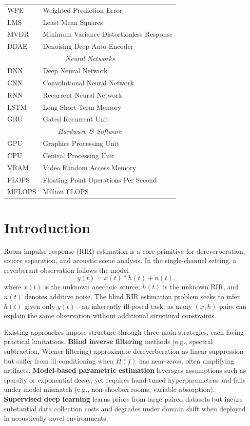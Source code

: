 \documentclass[12pt,a4paper]{article}
\begin{document}
\begin{table}[h]
\begin{tabular}{ll}
WPE & Weighted Prediction Error \\
LMS & Least Mean Squares \\
MVDR & Minimum Variance Distortionless Response \\
DDAE & Denoising Deep Auto-Encoder \\
\midrule
\multicolumn{2}{c}{\textit{Neural Networks}} \\
\midrule
DNN & Deep Neural Network \\
CNN & Convolutional Neural Network \\
RNN & Recurrent Neural Network \\
LSTM & Long Short-Term Memory \\
GRU & Gated Recurrent Unit \\
\midrule
\multicolumn{2}{c}{\textit{Hardware \& Software}} \\
\midrule
GPU & Graphics Processing Unit \\
CPU & Central Processing Unit \\
VRAM & Video Random Access Memory \\
FLOPS & Floating Point Operations Per Second \\
MFLOPS & Million FLOPS \\
\bottomrule
\end{tabular}
\end{table}

\clearpage

\section{Introduction}

Room impulse response (RIR) estimation is a core primitive for dereverberation, source separation, and acoustic scene analysis. In the single-channel setting, a reverberant observation follows the model
\begin{equation}
y(t) = x(t) * h(t) + n(t),
\end{equation}
where $x(t)$ is the unknown anechoic source, $h(t)$ is the unknown RIR, and $n(t)$ denotes additive noise. The blind RIR estimation problem seeks to infer $h(t)$ given only $y(t)$—an inherently ill-posed task, as many $(x,h)$ pairs can explain the same observation without additional structural constraints.

Existing approaches impose structure through three main strategies, each facing practical limitations. \textbf{Blind inverse filtering} methods (e.g., spectral subtraction, Wiener filtering) approximate dereverberation as linear suppression but suffer from ill-conditioning when $H(f)$ has near-zeros, often amplifying artifacts. \textbf{Model-based parametric estimation} leverages assumptions such as sparsity or exponential decay, yet requires hand-tuned hyperparameters and fails under model mismatch (e.g., non-shoebox rooms, variable absorption). \textbf{Supervised deep learning} learns priors from large paired datasets but incurs substantial data collection costs and degrades under domain shift when deployed in acoustically novel environments.
\end{document}
